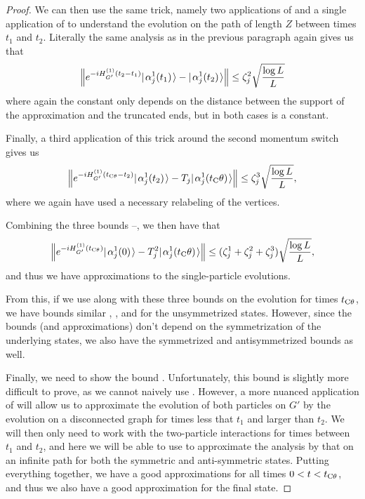 \documentclass[../thesis-main/thesis-main]{subfiles}
\begin{document}
\begin{proof}
We can then use the same trick, namely two applications of  and a single application of  to understand the evolution on the path of length $Z$ between times $t_1$ and $t_2$.  Literally the same analysis as in the previous paragraph again gives us that
\begin{align}
  \Big\Vert e^{-i H_{G'}^{(1)} (t_2- t_1) } |\mspace{2mu} \alpha_j^{1}(t_1) \mspace{2mu} \rangle - |\mspace{2mu} \alpha_j^{1}(t_2) \mspace{2mu} \rangle \Big\Vert \leq \zeta_j^2\sqrt{\frac{\log L}{L}}
  \label{eq:two_particle_gadget_single_bound_2}
\end{align}
where again the constant only depends on the distance between the support of the approximation and the truncated ends, but in both cases is a constant.

Finally, a third application of this trick around the second momentum switch gives us
\begin{align}
   \Big\Vert e^{-i H_{G'}^{(1)} (t_{\mathrm{C}\theta}- t_2) } |\mspace{2mu} \alpha_j^{1}(t_2) \mspace{2mu} \rangle - T_j |\mspace{2mu} \alpha_j^{1}(t_\mathrm{C}\theta) \mspace{2mu} \rangle \Big\Vert \leq \zeta_j^3\sqrt{\frac{\log L}{L}},
     \label{eq:two_particle_gadget_single_bound_3}
\end{align}
where we again have used a necessary relabeling of the vertices.

Combining the three bounds --, we then have that
\begin{align}
  \Big\Vert e^{-i H_{G'}^{(1)} (t_{\mathrm{C}\theta}) } |\mspace{2mu} \alpha_j^{1}(0) \mspace{2mu} \rangle - T_j^2 |\mspace{2mu} \alpha_j^{1}(t_\mathrm{C}\theta) \mspace{2mu} \rangle \Big\Vert \leq (\zeta_j^1 + \zeta_j^2 + \zeta_j^3)\sqrt{\frac{\log L}{L}},
\end{align}
and thus we have approximations to the single-particle evolutions.

From this, if we use  along with these three bounds on the evolution for times $t_{\mathrm{C}\theta}$, we have bounds similar , , and  for the unsymmetrized states.  However, since the bounds (and approximations) don't depend on the symmetrization of the underlying states, we also have the symmetrized and antisymmetrized bounds as well.

Finally, we need to show the bound .  Unfortunately, this bound is slightly more difficult to prove, as we cannot naively use .  However, a more nuanced application of  will allow us to approximate the evolution of both particles on $G'$ by the evolution on a disconnected graph for times less that $t_1$ and larger than $t_2$.  We will then only need to work with the two-particle interactions for times between $t_1$ and $t_2$, and here we will be able to use  to approximate the analysis by that on an infinite path for both the symmetric and anti-symmetric states.  Putting everything together, we have a good approximations for all times $0 < t < t_{\mathrm{C}\theta}$, and thus we also have a good approximation for the final state.


\end{proof}
\end{document}
